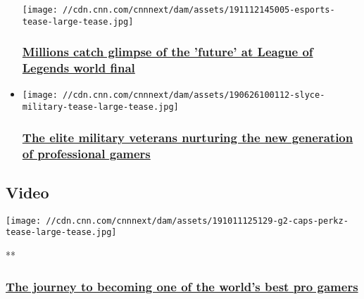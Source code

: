 \begin{itemize}
  \texttt{[image: //cdn.cnn.com/cnnnext/dam/assets/191112145005-esports-tease-large-tease.jpg]}

  \hypertarget{millions-catch-glimpse-of-the-future-at-league-of-legends-world-final}{%
  \subsubsection{\texorpdfstring{\href{/2019/11/12/sport/esports-g2-league-of-legends-carlos-worlds-spt-intl/index.html}{Millions
  catch glimpse of the 'future' at League of Legends world
  final}}{Millions catch glimpse of the 'future' at League of Legends world final}}\label{millions-catch-glimpse-of-the-future-at-league-of-legends-world-final}}
\item
  \href{/2019/07/01/sport/esports-special-forces-marines-splyce-spt-intl/index.html}{}

  \texttt{[image: //cdn.cnn.com/cnnnext/dam/assets/190626100112-slyce-military-tease-large-tease.jpg]}

  \hypertarget{the-elite-military-veterans-nurturing-the-new-generation-of-professional-gamers}{%
  \subsubsection{\texorpdfstring{\href{/2019/07/01/sport/esports-special-forces-marines-splyce-spt-intl/index.html}{The
  elite military veterans nurturing the new generation of professional
  gamers}}{The elite military veterans nurturing the new generation of professional gamers}}\label{the-elite-military-veterans-nurturing-the-new-generation-of-professional-gamers}}
\end{itemize}

\hypertarget{video}{%
\subsection{Video}\label{video}}

\href{/videos/sports/2019/10/11/perkz-caps-g2-esports-league-of-legends-world-championships-europe-spt-intl-lon-orig.cnn}{}

\texttt{[image: //cdn.cnn.com/cnnnext/dam/assets/191011125129-g2-caps-perkz-tease-large-tease.jpg]}

**

\hypertarget{the-journey-to-becoming-one-of-the-worlds-best-pro-gamers}{%
\subsubsection{\texorpdfstring{\href{/videos/sports/2019/10/11/perkz-caps-g2-esports-league-of-legends-world-championships-europe-spt-intl-lon-orig.cnn}{The
journey to becoming one of the world's best pro
gamers}}{The journey to becoming one of the world's best pro gamers}}\label{the-journey-to-becoming-one-of-the-worlds-best-pro-gamers}}

